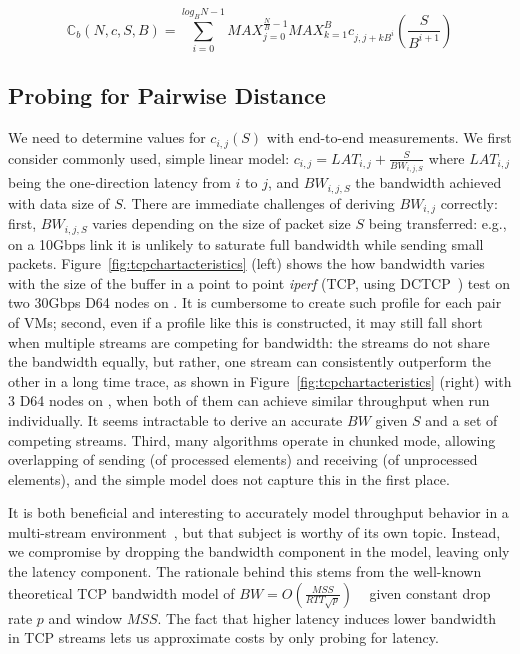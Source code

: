 {\small
$$\mathbb{C}_{b}(N, c, S, B) = \sum_{i=0}^{log_BN-1}MAX_{j=0}^{\frac{N}{B}-1}MAX_{k=1}^{B}c_{j,j+kB^i}(\frac{S}{B^{i+1}}) $$
}

\subsection{Probing for Pairwise Distance}
\label{sec:probinglatency}
We need to determine values for $c_{i,j}(S)$ with end-to-end measurements. We first consider commonly used, simple linear model: $c_{i,j} = LAT_{i,j} + \frac{S}{BW_{i,j,S}}$ where $LAT_{i,j}$ being the one-direction latency from $i$ to $j$, and $BW_{i,j,S}$ the bandwidth achieved with data size of $S$. There are immediate challenges of deriving $BW_{i,j}$ correctly: first, $BW_{i,j,S}$ varies depending on the size of packet size $S$ being transferred: e.g., on a 10Gbps link it is unlikely to saturate full bandwidth while sending small packets. Figure~\ref{fig:tcpchartacteristics} (left) shows the how bandwidth varies with the size of the buffer in a point to point \textit{iperf} (TCP, using DCTCP~\cite{10.1145/1851182.1851192}) test on two 30Gbps D64 nodes on \azure. It is cumbersome to create such profile for each pair of VMs; second, even if a profile like this is constructed, it may still fall short when multiple streams are competing for bandwidth: the streams do not share the bandwidth equally, but rather, one stream can consistently outperform the other in a long time trace, as shown in Figure~\ref{fig:tcpchartacteristics} (right) with 3 D64 nodes on \azure, when both of them can achieve similar throughput when run individually. It seems intractable to derive an accurate $BW$ given $S$ and a set of competing streams. Third, many algorithms operate in chunked mode, allowing overlapping of sending (of processed elements) and receiving (of unprocessed elements), and the simple model does not capture this in the first place. 

It is both beneficial and interesting to accurately model throughput behavior in a multi-stream environment~\cite{data-center-tcp-dctcp,tcphsfairness,10.1007/978-3-540-72606-7_86,ha2008cubic}, but that subject is worthy of its own topic. Instead, we compromise by dropping the bandwidth component in the model, leaving only the latency component. The rationale behind this stems from the well-known theoretical TCP bandwidth model of $BW=O(\frac{MSS}{RTT\sqrt{p}})$ ~\cite{mathis1997macroscopic} given constant drop rate $p$ and window $MSS$. The fact that higher latency induces lower bandwidth in TCP streams lets us approximate costs by only probing for latency.

